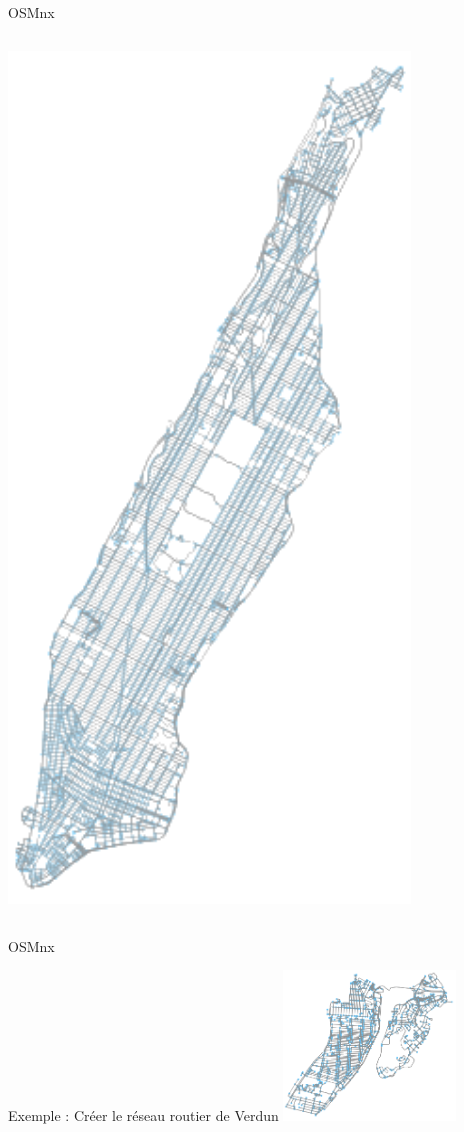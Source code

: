 \documentclass[aspectratio=169]{beamer}
\begin{document}
\begin{frame}{OSMnx \cite{boeing2017osmnx}}
\begin{columns}
\begin{column}{0.25\textwidth}
\begin{center}
     \includegraphics[width=0.8\textwidth]{figures/osmnx_manhattan}
     \end{center}
\end{column}
\end{columns}
\end{frame}

\begin{frame}{OSMnx \cite{boeing2017osmnx}}

{\Large Exemple : Créer le réseau routier de Verdun}
{\small }
\centering
\includegraphics[height=4cm]{figures/verdun_network}

\end{frame}
\end{document}
